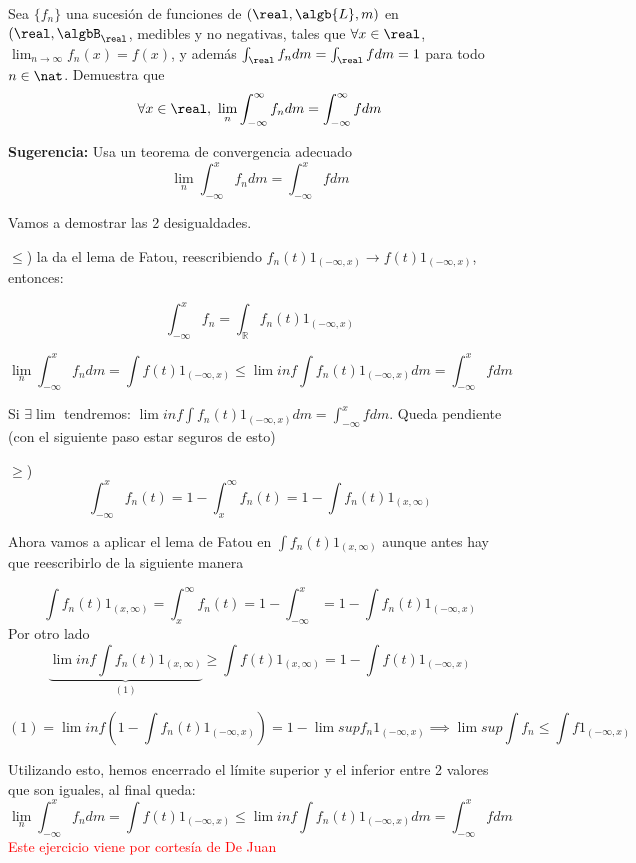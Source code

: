 \begin{problem}[13]
Sea $\{f_n\}$ una sucesión de funciones de $(\real, \algb{L}, m)$ en $(\real, \algbB_{\real}$, medibles y no negativas, tales que $\forall x \in \real$, $\lim_{n \to \infty}f_n(x) = f(x)$, y además $\int_{\real}f_n dm = \int_{\real} fdm=1$ para todo $n \in \nat$. Demuestra que
\[\forall x \in \real, \ \lim_{n}\int_{-\infty}^{\infty}f_n dm = \int_{-\infty}^{\infty} f dm\]

\textbf{Sugerencia:} Usa un teorema de convergencia adecuado
\solution
\[\lim_n \int_{-∞}^{x}f_n dm = \int_{-∞}^{x}fdm\]

Vamos a demostrar las 2 desigualdades.

$≤$) la da el lema de Fatou, reescribiendo $f_n(t)1_{(-∞,x)} \to f(t)1_{(-∞,x)}$, entonces:

\[\int_{-∞}^{x} f_n = \int_{ℝ} f_n(t)1_{(-∞,x)}\]

\[\lim_n \int_{-∞}^{x} f_n dm = \int f(t)1_{(-∞,x)} ≤ \lim inf \int f_n(t)1_{(-∞,x)}dm =  \int_{-∞}^{x}fdm\]

Si $∃ \lim$ tendremos: $\lim inf \int f_n(t)1_{(-∞,x)}dm =  \int_{-∞}^{x}fdm$. Queda pendiente (con el siguiente paso estar seguros de esto)

$≥$)
\[\int_{-∞}^{x} f_n(t) = 1-\int_{x}^{∞} f_n(t) = 1 - \int f_n(t) 1_{(x,∞)} \]

Ahora vamos a aplicar el lema de Fatou en $\int f_n(t) 1_{(x,∞)}$ aunque antes hay que reescribirlo de la siguiente manera

\[\int f_n(t) 1_{(x,∞)}  = \int_x^∞ f_n(t) = 1 -\int_{-∞}^{x} = 1 - \int f_n(t) 1_{(-∞,x)} \]
Por otro lado
\[\underbrace{\lim inf \int f_n(t) 1_{(x,∞)}}_{(1)} ≥ \int f(t) 1_{(x,∞)} = 1 - \int f(t) 1_{(-∞,x)}\]

\[(1) = \lim inf \left(1-\int f_n(t) 1_{(-∞,x)}\right) = 1-\lim sup f_n 1_{(-∞,x)} \implies \lim sup \int f_n ≤ \int f 1_{(-∞,x)}\]

Utilizando esto, hemos encerrado el límite superior y el inferior entre 2 valores que son iguales, al final queda:
\[\lim_n \int_{-∞}^{x} f_n dm = \int f(t)1_{(-∞,x)} ≤ \lim inf \int f_n(t)1_{(-∞,x)}dm =  \int_{-∞}^{x}fdm\]
\textcolor{red}{Este ejercicio viene por cortesía de De Juan}
\end{problem}

